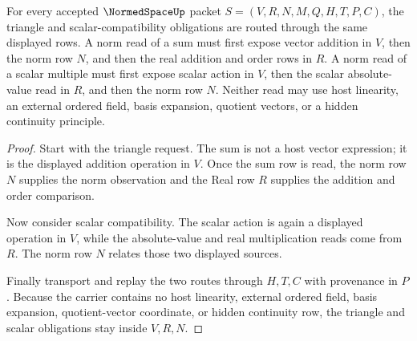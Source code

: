 \begin{theorem}
\label{thm:normed-space-triangle-scalar-compatibility}
For every accepted $\NormedSpaceUp$ packet $S=(V,R,N,M,Q,H,T,P,C)$, the triangle and scalar-compatibility obligations are routed through the same displayed rows. A norm read of a sum must first expose vector addition in $V$, then the norm row $N$, and then the real addition and order rows in $R$. A norm read of a scalar multiple must first expose scalar action in $V$, then the scalar absolute-value read in $R$, and then the norm row $N$. Neither read may use host linearity, an external ordered field, basis expansion, quotient vectors, or a hidden continuity principle.
\end{theorem}
\begin{proof}
Start with the triangle request. The sum is not a host vector expression; it is the displayed addition operation in $V$. Once the sum row is read, the norm row $N$ supplies the norm observation and the Real row $R$ supplies the addition and order comparison.

Now consider scalar compatibility. The scalar action is again a displayed operation in $V$, while the absolute-value and real multiplication reads come from $R$. The norm row $N$ relates those two displayed sources.

Finally transport and replay the two routes through $H,T,C$ with provenance in $P$. Because the carrier contains no host linearity, external ordered field, basis expansion, quotient-vector coordinate, or hidden continuity row, the triangle and scalar obligations stay inside $V,R,N$.
\end{proof}

